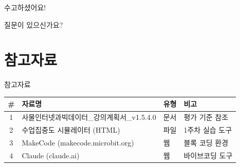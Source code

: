 \documentclass[aspectratio=169]{beamer}
\begin{document}
\begin{frame}[standout]
 수고하셨어요!

\vspace{0.5cm}
질문이 있으신가요?
\end{frame}

\section*{참고자료}
\begin{frame}{ 참고자료}
\begin{center}
\renewcommand{\arraystretch}{1.4}
\begin{tabular}{clll}
\toprule
\textbf{\#} & \textbf{자료명} & \textbf{유형} & \textbf{비고} \\
\midrule
1 & 사물인터넷과빅데이터\_강의계획서\_v1.5.4.0 & 문서 & 평가 기준 참조 \\
2 & 수업집중도 시뮬레이터 (HTML) & 파일 & 1주차 실습 도구 \\
3 & MakeCode (makecode.microbit.org) & 웹 & 블록 코딩 환경 \\
4 & Claude (claude.ai) & 웹 & 바이브코딩 도구 \\
\bottomrule
\end{tabular}
\end{center}
\end{frame}
\end{document}

